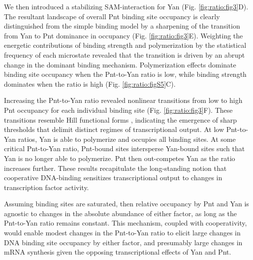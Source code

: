 We then introduced a stabilizing SAM-interaction for Yan (Fig. \ref{fig:ratio:fig3}D). The resultant landscape of overall Pnt binding site occupancy is clearly distinguished from the simple binding model by a sharpening of the transition from Yan to Pnt dominance in occupancy (Fig. \ref{fig:ratio:fig3}E). Weighting the energetic contributions of binding strength and polymerization by the statistical frequency of each microstate revealed that the transition is driven by an abrupt change in the dominant binding mechanism. Polymerization effects dominate binding site occupancy when the Pnt-to-Yan ratio is low, while binding strength dominates when the ratio is high (Fig. \ref{fig:ratio:figS5}C).

Increasing the Pnt-to-Yan ratio revealed nonlinear transitions from low to high Pnt occupancy for each individual binding site (Fig. \ref{fig:ratio:fig3}F). These transitions resemble Hill functional forms \cite{Fogler1987}, indicating the emergence of sharp thresholds that delimit distinct regimes of transcriptional output. At low Pnt-to-Yan ratios, Yan is able to polymerize and occupies all binding sites. At some critical Pnt-to-Yan ratio, Pnt-bound sites intersperse Yan-bound sites such that Yan is no longer able to polymerize. Pnt then out-competes Yan as the ratio increases further. These results recapitulate the long-standing notion that cooperative DNA-binding sensitizes transcriptional output to changes in transcription factor activity.

Assuming binding sites are saturated, then relative occupancy by Pnt and Yan is agnostic to changes in the absolute abundance of either factor, as long as the Pnt-to-Yan ratio remains constant. This mechanism, coupled with cooperativity, would enable modest changes in the Pnt-to-Yan ratio to elicit large changes in DNA binding site occupancy by either factor, and presumably large changes in mRNA synthesis given the opposing transcriptional effects of Yan and Pnt.

